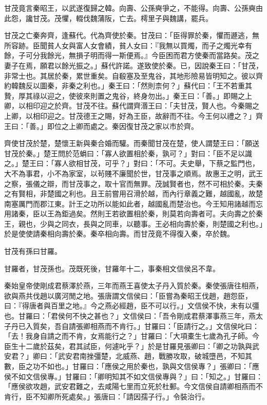 \begin{pinyinscope}
甘茂竟言秦昭王，以武遂復歸之韓。向壽、公孫奭爭之，不能得。向壽、公孫奭由此怨，讒甘茂。茂懼，輟伐魏蒲阪，亡去。樗里子與魏講，罷兵。

甘茂之亡秦奔齊，逢蘇代。代為齊使於秦。甘茂曰：「臣得罪於秦，懼而遯逃，無所容跡。臣聞貧人女與富人女會績，貧人女曰：『我無以買燭，而子之燭光幸有餘，子可分我餘光，無損子明而得一斯便焉。』今臣困而君方使秦而當路矣。茂之妻子在焉，願君以餘光振之。」蘇代許諾。遂致使於秦。已，因說秦王曰：「甘茂，非常士也。其居於秦，累世重矣。自殽塞及至鬼谷，其地形險易皆明知之。彼以齊約韓魏反以圖秦，非秦之利也。」秦王曰：「然則柰何？」蘇代曰：「王不若重其贄，厚其祿以迎之，使彼來則置之鬼谷，終身勿出。」秦王曰：「善。」即賜之上卿，以相印迎之於齊。甘茂不往。蘇代謂齊湣王曰：「夫甘茂，賢人也。今秦賜之上卿，以相印迎之。甘茂德王之賜，好為王臣，故辭而不往。今王何以禮之？」齊王曰：「善。」即位之上卿而處之。秦因復甘茂之家以市於齊。

齊使甘茂於楚，楚懷王新與秦合婚而驩。而秦聞甘茂在楚，使人謂楚王曰：「願送甘茂於秦。」楚王問於范蜎曰：「寡人欲置相於秦，孰可？」對曰：「臣不足以識之。」楚王曰：「寡人欲相甘茂，可乎？」對曰：「不可。夫史舉，下蔡之監門也，大不為事君，小不為家室，以茍賤不廉聞於世，甘茂事之順焉。故惠王之明，武王之察，張儀之辯，而甘茂事之，取十官而無罪。茂誠賢者也，然不可相於秦。夫秦之有賢相，非楚國之利也。且王前嘗用召滑於越，而內行章義之難，越國亂，故楚南塞厲門而郡江東。計王之功所以能如此者，越國亂而楚治也。今王知用諸越而忘用諸秦，臣以王為鉅過矣。然則王若欲置相於秦，則莫若向壽者可。夫向壽之於秦王，親也，少與之同衣，長與之同車，以聽事。王必相向壽於秦，則楚國之利也。」於是使使請秦相向壽於秦。秦卒相向壽。而甘茂竟不得復入秦，卒於魏。

甘茂有孫曰甘羅。

甘羅者，甘茂孫也。茂既死後，甘羅年十二，事秦相文信侯呂不韋。

秦始皇帝使剛成君蔡澤於燕，三年而燕王喜使太子丹入質於秦。秦使張唐往相燕，欲與燕共伐趙以廣河閒之地。張唐謂文信侯曰：「臣嘗為秦昭王伐趙，趙怨臣，曰：『得唐者與百里之地。』今之燕必經趙，臣不可以行。」文信侯不快，未有以彊也。甘羅曰：「君侯何不快之甚也？」文信侯曰：「吾令剛成君蔡澤事燕三年，燕太子丹已入質矣，吾自請張卿相燕而不肯行。」甘羅曰：「臣請行之。」文信侯叱曰：「去！我身自請之而不肯，女焉能行之？」甘羅曰：「大項橐生七歲為孔子師。今臣生十二歲於茲矣，君其試臣，何遽叱乎？」於是甘羅見張卿曰：「卿之功孰與武安君？」卿曰：「武安君南挫彊楚，北威燕、趙，戰勝攻取，破城墮邑，不知其數，臣之功不如也。」甘羅曰：「應侯之用於秦也，孰與文信侯專？」張卿曰：「應侯不如文信侯專。」甘羅曰：「卿明知其不如文信侯專與？」曰：「知之。」甘羅曰：「應侯欲攻趙，武安君難之，去咸陽七里而立死於杜郵。今文信侯自請卿相燕而不肯行，臣不知卿所死處矣。」張唐曰：「請因孺子行。」令裝治行。


\end{pinyinscope}
